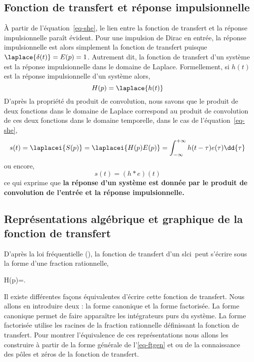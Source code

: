 \subsection{Fonction de transfert et réponse impulsionnelle}
À partir de l'équation~\ref{eq-she}, le lien entre la fonction de transfert
et la réponse impulsionnelle paraît évident. Pour une impulsion de Dirac 
en entrée, la réponse impulsionnelle est alors simplement la fonction 
de transfert puisque $\laplace{\delta(t)}=E(p)=1$. Autrement dit, 
la fonction de transfert d'un système est la réponse impulsionnelle 
dans le domaine de Laplace. Formellement, si $h(t)$ est la réponse 
impulsionnelle d'un système alors,
$$
H(p) = \laplace{h(t)}
$$
D'après la propriété du produit de convolution, nous savons que 
le produit de deux fonctions dans le domaine de Laplace correspond au 
produit de convolution de ces deux fonctions dans le domaine temporelle, 
dans le cas de l'équation~\ref{eq-she},
$$
s(t)=\laplacei{S(p)}=\laplacei{H(p)E(p)}
=\int_{-\infty}^{+\infty}h(t-\tau)e(\tau)\dd{\tau}
$$
ou encore,
$$
s(t)=(h*e)(t)
$$
ce qui exprime que \textbf{la réponse d'un système est donnée par le 
produit de convolution de l'entrée  et la réponse impulsionnelle.}

\subsection
[Représentation de la fonction de transfert]
{Représentations algébrique et graphique de la fonction de transfert}

D'après la loi fréquentielle (), la fonction de transfert 
d'un \gls{slci}~peut s'écrire sous la forme d'une fraction rationnelle,
\begin{bequation}
H(p)=. 
\label{eq-ftgen}
\end{bequation}

Il existe différentes façons équivalentes d'écrire cette fonction de transfert.
Nous allons en introduire deux :
la forme canonique et la forme factorisée. La forme canonique permet de 
faire apparaître les intégrateurs purs du système. La forme factorisée 
utilise les racines de la fraction rationnelle définissant la 
fonction de transfert. Pour montrer l'équivalence de ces représentations 
nous allons les construire à partir de la forme générale de l'\cref{eq-ftgen} 
et ou de la connaissance des pôles et zéros de la fonction de transfert.

